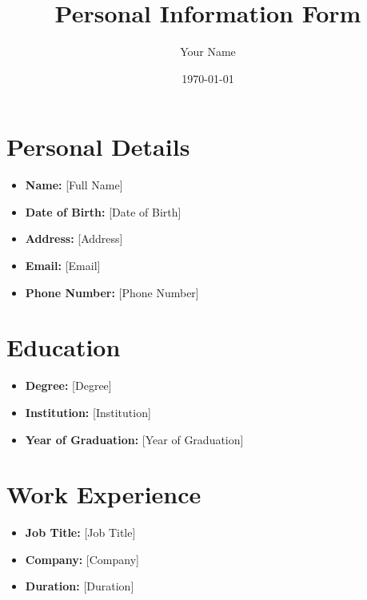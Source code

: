\documentclass{article}
\begin{document}
\title{Personal Information Form}
\author{Your Name}
\date{\today}

\maketitle

\section{Personal Details}

\begin{itemize}
  \item \textbf{Name:} [Full Name]
  \item \textbf{Date of Birth:} [Date of Birth]
  \item \textbf{Address:} [Address]
  \item \textbf{Email:} [Email]
  \item \textbf{Phone Number:} [Phone Number]
\end{itemize}

\section{Education}

\begin{itemize}
  \item \textbf{Degree:} [Degree]
  \item \textbf{Institution:} [Institution]
  \item \textbf{Year of Graduation:} [Year of Graduation]
\end{itemize}

\section{Work Experience}

\begin{itemize}
  \item \textbf{Job Title:} [Job Title]
  \item \textbf{Company:} [Company]
  \item \textbf{Duration:} [Duration]
\end{itemize}
\end{document}
